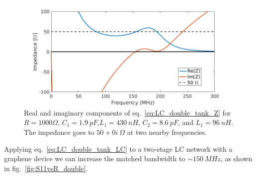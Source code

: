 \begin{figure}
\centering
\includegraphics[width=120mm]{figures/Johnson_noise_thermometry/Z_doubleTank.png}
\caption{Real and imaginary components of eq.~\ref{eq:LC_double_tank_Z} for $R=1000\Omega$, $C_1=1.9~pF$,$L_1=430~nH$, $C_2=8.6~pF$, and $L_1=96~nH$. The impedance goes to $50+0i~\Omega$ at two nearby frequencies.}
\label{fig:LC_double_tank_Z}
\end{figure}
Applying eq.~\ref{eq:LC_double_tank_LC} to a two-stage LC network with a graphene device we can increase the matched bandwidth to ${\sim}150~MHz$, as shown in fig.~\ref{fig:S11vsR_double}.

